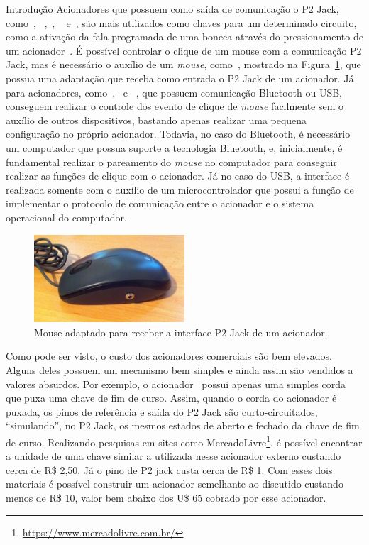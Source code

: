 \begin{chapter}{Introdução}
Acionadores que possuem como saída de comunicação o P2 Jack,
como~\cite{CandyCorn}, ~\cite{JellyBean},~\cite{MicroLight}, ~\cite{HoneyBee}
e~\cite{StringSwitch}, são mais utilizados como chaves para um determinado
circuito, como a ativação da fala programada de uma boneca através do
pressionamento de um acionador~\cite{ATswitchYT}. %
É possível controlar o clique de um mouse com a comunicação P2
Jack, mas é necessário o auxílio de um \textit{mouse}, como~\cite{MouseJack},
mostrado na Figura~\ref{fig:mouse}, que possua uma adaptação que receba como
entrada o P2 Jack de um acionador.  Já para acionadores,
como~\cite{Blue2},~\cite{FootPedal} e ~\cite{SipPuff}, que possuem comunicação
Bluetooth ou USB, conseguem realizar o controle dos evento de clique de
\textit{mouse} facilmente sem o auxílio de outros dispositivos, bastando apenas
realizar uma pequena configuração no próprio acionador. Todavia, no caso do
Bluetooth, é necessário um computador que possua suporte a tecnologia Bluetooth,
e, inicialmente, é fundamental realizar o pareamento do \textit{mouse} no
computador para conseguir realizar as funções de clique com o acionador. Já no
caso do USB, a interface é realizada somente com o auxílio de um
microcontrolador que possui a função de implementar o protocolo de comunicação
entre o acionador e o sistema operacional do computador.

\begin{figure}[!h]
	\centering
	\includegraphics[width=0.5\textwidth]{fig/mouse13}
	\caption{Mouse adaptado para receber a interface P2 Jack de um acionador.}
	\label{fig:mouse}
\end{figure}

Como pode ser visto, o custo dos acionadores comerciais são bem elevados. Alguns
deles possuem um mecanismo bem simples e ainda assim são vendidos a valores
absurdos. Por exemplo, o acionador~\cite{StringSwitch} possui apenas uma simples
corda que puxa uma chave de fim de curso. Assim, quando o corda do acionador é
puxada, os pinos de referência e saída do P2 Jack são curto-circuitados,
``simulando'', no P2 Jack, os mesmos estados de aberto e fechado da chave de fim
de curso. Realizando pesquisas em sites como
MercadoLivre\footnote{\url{https://www.mercadolivre.com.br/}}, é possível
encontrar a unidade de uma chave similar a utilizada nesse acionador externo
custando cerca de R\$ 2,50. Já o pino de P2 jack custa cerca de R\$ 1. Com esses
dois materiais é possível construir um acionador semelhante ao discutido
custando menos de R\$ 10, valor bem abaixo dos U\$ 65 cobrado por esse
acionador. %


\end{chapter}
